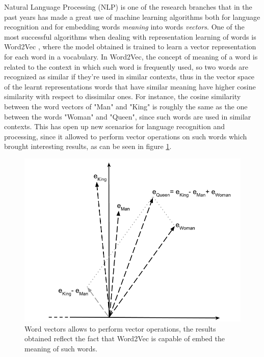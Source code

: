 \documentclass[%
    corpo=13.5pt,
    twoside,
    oldstyle,
    tipotesi=magistrale,
    greek,
    evenboxes
]{toptesi}
\begin{document}
Natural Language Processing (NLP) is one of the research branches that in
the past years has made a great use of machine learning algorithms both for
language recognition and for embedding words \emph{meaning} into words
\emph{vectors}.
One of the most successful algorithms when dealing with representation learning
of words is Word2Vec \cite{mikolov2013}, where the model obtained is trained to
learn a vector representation for each word in a vocabulary.
In Word2Vec, the concept of meaning of a word is related to the context in
which such word is frequently used, so two words are recognized as similar if
they're used in similar contexts, thus in the vector space of the learnt
representations words that have similar meaning have higher cosine similarity
with respect to dissimilar ones.
For instance, the cosine similarity between the word vectors of "Man" and "King"
is roughly the same as the one between the words "Woman" and "Queen", since such
words are used in similar contexts. This has open up new scenarios for
language recognition and processing, since it allowed to perform vector
operations on such words which brought interesting results, as can be seen
in figure \ref{fig:word2vec}.

\begin{figure}[h]
    \centering
    \includegraphics[scale=0.4]{img/word2vec.png}
    \caption{
        Word vectors allows to perform vector operations, the results
        obtained reflect the fact that Word2Vec is capable of embed the
        meaning of such words.
    }
    \label{fig:word2vec}
    \end{figure}
\end{document}
